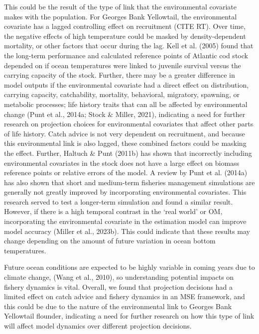 \documentclass[
  12pt,
]{article}
\begin{document}
This could be the result of the type of link that the environmental covariate makes with the population. For Georges Bank Yellowtail, the environmental covariate has a lagged controlling effect on recruitment (CITE RT). Over time, the negative effects of high temperature could be masked by density-dependent mortality, or other factors that occur during the lag. Kell et al. (2005) found that the long-term performance and calculated reference points of Atlantic cod stock depended on if ocean temperatures were linked to juvenile survival versus the carrying capacity of the stock. Further, there may be a greater difference in model outputs if the environmental covariate had a direct effect on distribution, carrying capacity, catchability, mortality, behavioral, migratory, spawning, or metabolic processes; life history traits that can all be affected by environmental change (Punt et al., 2014a; Stock \& Miller, 2021), indicating a need for further research on projection choices for environmental covariates that affect other parts of life history. Catch advice is not very dependent on recruitment, and because this environmental link is also lagged, these combined factors could be masking the effect. Further, Haltuch \& Punt (2011b) has shown that incorrectly including environmental covariates in the stock does not have a large effect on biomass reference points or relative errors of the model. A review by Punt et al. (2014a) has also shown that short and medium-term fisheries management simulations are generally not greatly improved by incorporating environmental covariates. This research served to test a longer-term simulation and found a similar result. However, if there is a high temporal contrast in the `real world' or OM, incorporating the environmental covariate in the estimation model can improve model accuracy (Miller et al., 2023b). This could indicate that these results may change depending on the amount of future variation in ocean bottom temperatures.

Future ocean conditions are expected to be highly variable in coming years due to climate change, (Wang et al., 2010), so understanding potential impacts on fishery dynamics is vital. Overall, we found that projection decisions had a limited effect on catch advice and fishery dynamics in an MSE framework, and this could be due to the nature of the environmental link to Georges Bank Yellowtail flounder, indicating a need for further research on how this type of link will affect model dynamics over different projection decisions.
\end{document}
